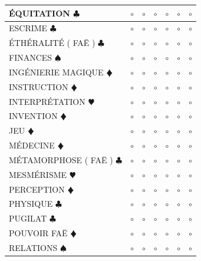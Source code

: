 \documentclass[a5paper]{letter}
\begin{document}
{{{{\begin{tabular}[c]{|p{}|p{}|p{}|p{}|p{}|p{}|p{}|}
	ÉQUITATION { $\clubsuit$ }							&	$\circ$	&	$\circ$	&	$\circ$	&	$\circ$	&	$\circ$		&	$\circ$		\\ \hline
	ESCRIME { $\clubsuit$ }								&	$\circ$	&	$\circ$	&	$\circ$	&	$\circ$	&	$\circ$		&	$\circ$		\\ \hline
	ÉTHÉRALITÉ ( FAË ) { $\clubsuit$ }					&	$\circ$	&	$\circ$	&	$\circ$	&	$\circ$	&	$\circ$		&	$\circ$		\\ \hline
	FINANCES { $\spadesuit$ }							&	$\circ$	&	$\circ$	&	$\circ$	&	$\circ$	&	$\circ$		&	$\circ$		\\ \hline
	INGÉNIERIE MAGIQUE {\color{red} $\vardiamond$ }		&	$\circ$	&	$\circ$	&	$\circ$	&	$\circ$	&	$\circ$		&	$\circ$		\\ \hline
	INSTRUCTION {\color{red} $\vardiamond$ }			&	$\circ$	&	$\circ$	&	$\circ$	&	$\circ$	&	$\circ$		&	$\circ$		\\ \hline
	INTERPRÉTATION {\color{red} $\varheart$ }			&	$\circ$	&	$\circ$	&	$\circ$	&	$\circ$	&	$\circ$		&	$\circ$		\\ \hline
	INVENTION {\color{red} $\vardiamond$ }				&	$\circ$	&	$\circ$	&	$\circ$	&	$\circ$	&	$\circ$		&	$\circ$		\\ \hline
	JEU {\color{red} $\vardiamond$ }					&	$\circ$	&	$\circ$	&	$\circ$	&	$\circ$	&	$\circ$		&	$\circ$		\\ \hline
	MÉDECINE {\color{red} $\vardiamond$ }				&	$\circ$	&	$\circ$	&	$\circ$	&	$\circ$	&	$\circ$		&	$\circ$		\\ \hline
	MÉTAMORPHOSE ( FAË ) { $\clubsuit$ }				&	$\circ$	&	$\circ$	&	$\circ$	&	$\circ$	&	$\circ$		&	$\circ$		\\ \hline
	MESMÉRISME {\color{red} $\varheart$ }				&	$\circ$	&	$\circ$	&	$\circ$	&	$\circ$	&	$\circ$		&	$\circ$		\\ \hline
	PERCEPTION {\color{red} $\vardiamond$ }				&	$\circ$	&	$\circ$	&	$\circ$	&	$\circ$	&	$\circ$		&	$\circ$		\\ \hline
	PHYSIQUE { $\clubsuit$ }							&	$\circ$	&	$\circ$	&	$\circ$	&	$\circ$	&	$\circ$		&	$\circ$		\\ \hline
	PUGILAT { $\clubsuit$ }								&	$\circ$	&	$\circ$	&	$\circ$	&	$\circ$	&	$\circ$		&	$\circ$		\\ \hline
	POUVOIR FAË {\color{red} $\vardiamond$ }			&	$\circ$	&	$\circ$	&	$\circ$	&	$\circ$	&	$\circ$		&	$\circ$		\\ \hline
	RELATIONS { $\spadesuit$ }							&	$\circ$	&	$\circ$	&	$\circ$	&	$\circ$	&	$\circ$		&	$\circ$		\\ \hline

\end{tabular}}}}}
\end{document}
